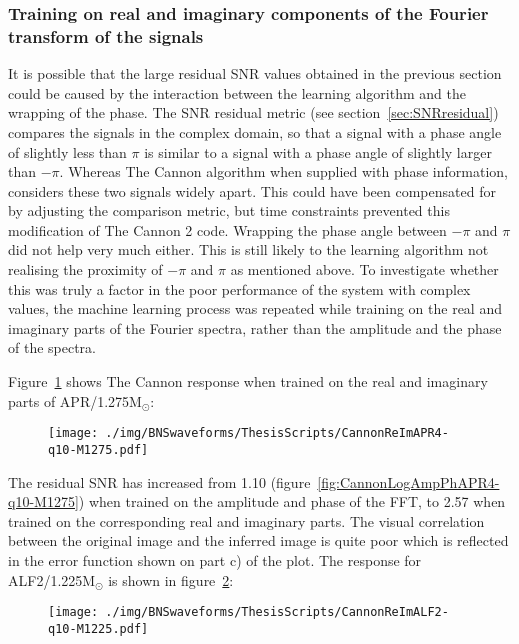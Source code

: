 \subsubsection{Training on real and imaginary components of the Fourier transform of the signals}
It is possible that the large residual SNR values obtained in the previous section could be caused by the interaction between the learning algorithm and the wrapping of the phase. The SNR residual metric (see section~\ref{sec:SNRresidual}) compares the signals in the complex domain, so that a signal with a phase angle of slightly less than $\pi$ is similar to a signal with a phase angle of slightly larger than $-\pi$. Whereas The Cannon algorithm when supplied with phase information, considers these two signals widely apart. This could have been compensated for by adjusting the comparison metric, but time constraints prevented this modification of The Cannon 2 code. Wrapping the phase angle between $-\pi$ and $\pi$ did not help very much either. This is still likely to the learning algorithm not realising the proximity of $-\pi$ and $\pi$ as mentioned above. To investigate whether this was truly a factor in the poor performance of the system with complex values, the machine learning process was repeated while training on the real and imaginary parts of the Fourier spectra, rather than the amplitude and the phase of the spectra. \par
Figure~\ref{fig:CannonReImAPR4-q10-M1275} shows The Cannon response when trained on the real and imaginary parts of APR/1.275M$_\odot$: 
\begin{figure}[H]
	\texttt{[image: ./img/BNSwaveforms/ThesisScripts/CannonReImAPR4-q10-M1275.pdf]} 
	\caption[\protect]{\protect}
	\label{fig:CannonReImAPR4-q10-M1275}
\end{figure}
The residual SNR has increased from 1.10 (figure~\ref{fig:CannonLogAmpPhAPR4-q10-M1275}) when trained on the amplitude and phase of the FFT, to 2.57 when trained on the corresponding real and imaginary parts. The visual correlation between the original image and the inferred image is quite poor which is reflected in the error function shown on part c) of the plot. The response for ALF2/1.225M$_\odot$ is shown in figure~\ref{fig:CannonReImALF2-q10-M1225}:
\begin{figure}[H]
	\texttt{[image: ./img/BNSwaveforms/ThesisScripts/CannonReImALF2-q10-M1225.pdf]} 
	\caption[\protect]{\protect}
	\label{fig:CannonReImALF2-q10-M1225}
\end{figure}
